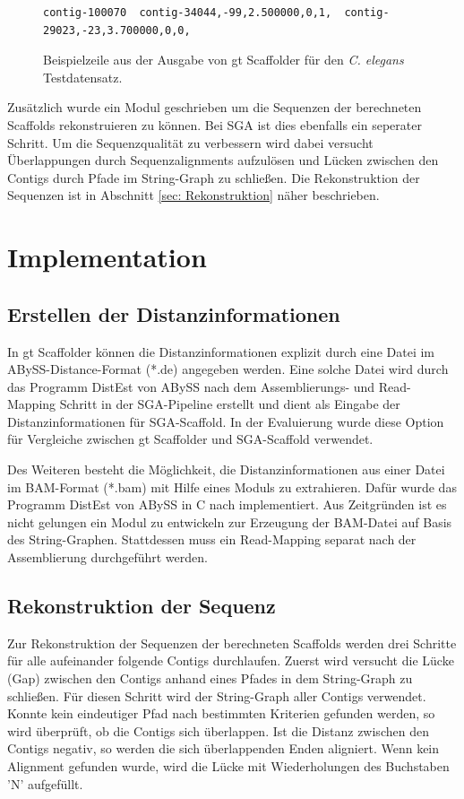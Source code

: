 \documentclass[a4paper,10pt,parskip]{scrartcl}
\begin{document}
\begin{figure}
\begin{verbatim}
contig-100070  contig-34044,-99,2.500000,0,1,  contig-29023,-23,3.700000,0,0,
\end{verbatim}
\caption{\label{abb: scaf}Beispielzeile aus der Ausgabe von gt
  Scaffolder für den \textit{C. elegans} Testdatensatz.}
\end{figure}

Zusätzlich wurde ein Modul geschrieben um die Sequenzen der
berechneten Scaffolds rekonstruieren zu können. Bei SGA ist dies
ebenfalls ein seperater Schritt. Um die Sequenzqualität zu verbessern
wird dabei versucht Überlappungen durch Sequenzalignments aufzulösen
und Lücken zwischen den Contigs durch Pfade im String-Graph zu
schließen. Die Rekonstruktion der Sequenzen ist in Abschnitt \ref{sec:
  Rekonstruktion} näher beschrieben.

\section{Implementation}
\label{sec: Implementation}
\subsection{Erstellen der Distanzinformationen}
In gt Scaffolder können die Distanzinformationen explizit durch eine
Datei im ABySS-Distance-Format (*.de) angegeben werden. Eine solche
Datei wird durch das Programm DistEst von ABySS nach dem Assemblierungs-
und Read-Mapping Schritt in der SGA-Pipeline erstellt und dient als
Eingabe der Distanzinformationen für SGA-Scaffold. In der Evaluierung wurde diese Option für Vergleiche zwischen gt Scaffolder und SGA-Scaffold
verwendet.

Des Weiteren besteht die Möglichkeit, die Distanzinformationen aus
einer Datei im BAM-Format (*.bam) mit Hilfe eines Moduls zu
extrahieren. Dafür wurde das Programm DistEst von ABySS in C nach
implementiert. Aus Zeitgründen ist es nicht gelungen ein Modul zu
entwickeln zur Erzeugung der BAM-Datei auf Basis des String-Graphen. Stattdessen muss ein Read-Mapping separat nach der Assemblierung
durchgeführt werden.

\subsection{Rekonstruktion der Sequenz}
\label{sec: Rekonstruktion}
Zur Rekonstruktion der Sequenzen der berechneten Scaffolds werden drei
Schritte für alle aufeinander folgende Contigs durchlaufen. Zuerst
wird versucht die Lücke (Gap) zwischen den Contigs anhand eines Pfades
in dem String-Graph zu schließen. Für diesen Schritt wird der
String-Graph aller Contigs verwendet. Konnte kein eindeutiger Pfad nach
bestimmten Kriterien gefunden werden, so wird überprüft, ob die
Contigs sich überlappen. Ist die Distanz zwischen den Contigs negativ,
so werden die sich überlappenden Enden aligniert. Wenn kein Alignment
gefunden wurde, wird die Lücke mit Wiederholungen des Buchstaben 'N'
aufgefüllt.
\end{document}
